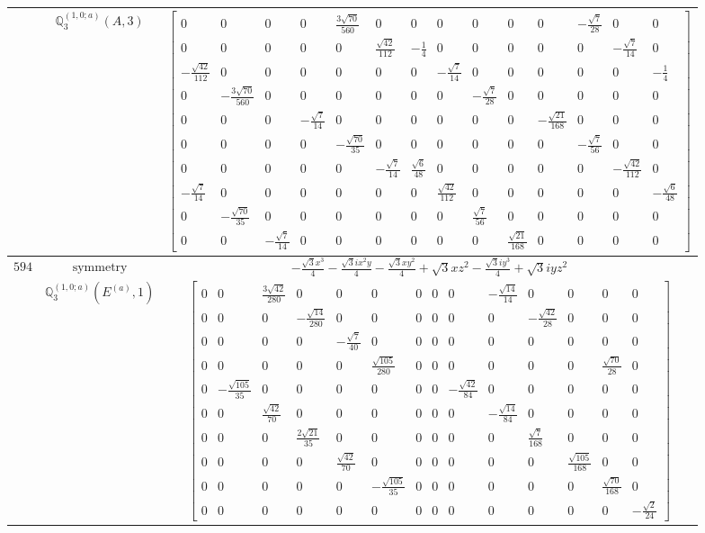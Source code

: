 \documentclass[fleqn,8pt,landscape]{jsarticle}
\begin{document}
\begin{longtable}{ccc}
$  $ & $ \mathbb{Q}_{3}^{(1,0;a)}(A,3) $ & $ \begin{bmatrix} 0 & 0 & 0 & 0 & \frac{3 \sqrt{70}}{560} & 0 & 0 & 0 & 0 & 0 & 0 & - \frac{\sqrt{7}}{28} & 0 & 0 \\ 0 & 0 & 0 & 0 & 0 & \frac{\sqrt{42}}{112} & - \frac{1}{4} & 0 & 0 & 0 & 0 & 0 & - \frac{\sqrt{7}}{14} & 0 \\ - \frac{\sqrt{42}}{112} & 0 & 0 & 0 & 0 & 0 & 0 & - \frac{\sqrt{7}}{14} & 0 & 0 & 0 & 0 & 0 & - \frac{1}{4} \\ 0 & - \frac{3 \sqrt{70}}{560} & 0 & 0 & 0 & 0 & 0 & 0 & - \frac{\sqrt{7}}{28} & 0 & 0 & 0 & 0 & 0 \\ 0 & 0 & 0 & - \frac{\sqrt{7}}{14} & 0 & 0 & 0 & 0 & 0 & 0 & - \frac{\sqrt{21}}{168} & 0 & 0 & 0 \\ 0 & 0 & 0 & 0 & - \frac{\sqrt{70}}{35} & 0 & 0 & 0 & 0 & 0 & 0 & - \frac{\sqrt{7}}{56} & 0 & 0 \\ 0 & 0 & 0 & 0 & 0 & - \frac{\sqrt{7}}{14} & \frac{\sqrt{6}}{48} & 0 & 0 & 0 & 0 & 0 & - \frac{\sqrt{42}}{112} & 0 \\ - \frac{\sqrt{7}}{14} & 0 & 0 & 0 & 0 & 0 & 0 & \frac{\sqrt{42}}{112} & 0 & 0 & 0 & 0 & 0 & - \frac{\sqrt{6}}{48} \\ 0 & - \frac{\sqrt{70}}{35} & 0 & 0 & 0 & 0 & 0 & 0 & \frac{\sqrt{7}}{56} & 0 & 0 & 0 & 0 & 0 \\ 0 & 0 & - \frac{\sqrt{7}}{14} & 0 & 0 & 0 & 0 & 0 & 0 & \frac{\sqrt{21}}{168} & 0 & 0 & 0 & 0 \end{bmatrix} $ \\ \hline
$ 594 $ & $ \text{symmetry} $ & $ - \frac{\sqrt{3} x^{3}}{4} - \frac{\sqrt{3} i x^{2} y}{4} - \frac{\sqrt{3} x y^{2}}{4} + \sqrt{3} x z^{2} - \frac{\sqrt{3} i y^{3}}{4} + \sqrt{3} i y z^{2} $ \\
$  $ & $ \mathbb{Q}_{3}^{(1,0;a)}(E^{(a)},1) $ & $ \begin{bmatrix} 0 & 0 & \frac{3 \sqrt{42}}{280} & 0 & 0 & 0 & 0 & 0 & 0 & - \frac{\sqrt{14}}{14} & 0 & 0 & 0 & 0 \\ 0 & 0 & 0 & - \frac{\sqrt{14}}{280} & 0 & 0 & 0 & 0 & 0 & 0 & - \frac{\sqrt{42}}{28} & 0 & 0 & 0 \\ 0 & 0 & 0 & 0 & - \frac{\sqrt{7}}{40} & 0 & 0 & 0 & 0 & 0 & 0 & 0 & 0 & 0 \\ 0 & 0 & 0 & 0 & 0 & \frac{\sqrt{105}}{280} & 0 & 0 & 0 & 0 & 0 & 0 & \frac{\sqrt{70}}{28} & 0 \\ 0 & - \frac{\sqrt{105}}{35} & 0 & 0 & 0 & 0 & 0 & 0 & - \frac{\sqrt{42}}{84} & 0 & 0 & 0 & 0 & 0 \\ 0 & 0 & \frac{\sqrt{42}}{70} & 0 & 0 & 0 & 0 & 0 & 0 & - \frac{\sqrt{14}}{84} & 0 & 0 & 0 & 0 \\ 0 & 0 & 0 & \frac{2 \sqrt{21}}{35} & 0 & 0 & 0 & 0 & 0 & 0 & \frac{\sqrt{7}}{168} & 0 & 0 & 0 \\ 0 & 0 & 0 & 0 & \frac{\sqrt{42}}{70} & 0 & 0 & 0 & 0 & 0 & 0 & \frac{\sqrt{105}}{168} & 0 & 0 \\ 0 & 0 & 0 & 0 & 0 & - \frac{\sqrt{105}}{35} & 0 & 0 & 0 & 0 & 0 & 0 & \frac{\sqrt{70}}{168} & 0 \\ 0 & 0 & 0 & 0 & 0 & 0 & 0 & 0 & 0 & 0 & 0 & 0 & 0 & - \frac{\sqrt{2}}{24} \end{bmatrix} $ \\ \hline

\end{longtable}
\end{document}
